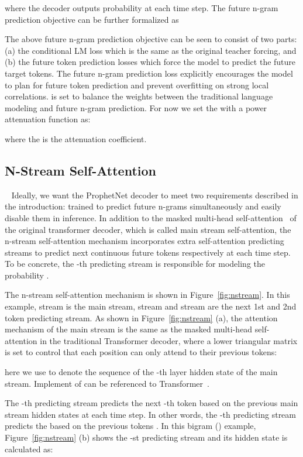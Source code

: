 \documentclass[11pt,a4paper]{article}
\begin{document}
where the decoder outputs  probability at each time step.
The future n-gram prediction objective can be further formalized as 

The above future n-gram prediction objective can be seen to consist of two parts: (a) the conditional LM loss which is the same as the original teacher forcing, and (b) the  future token prediction losses which force the model to predict the future target tokens.
The future n-gram prediction loss explicitly encourages the model to plan for future token prediction and prevent overfitting on strong local correlations. 
 is set to balance the weights between the traditional language modeling and future n-gram prediction. 
For now we set the  with a power attenuation function as:

where the  is the attenuation coefficient. 




\subsection{N-Stream Self-Attention}~\label{sec:m2}
Ideally, we want the ProphetNet decoder to meet two requirements described in the introduction: trained to predict future n-grams simultaneously and easily disable them in inference.
In addition to the masked multi-head self-attention~\cite{vaswani2017attention} of the original transformer decoder, which is called main stream self-attention, the n-stream self-attention mechanism incorporates  extra self-attention predicting streams to predict next  continuous future tokens respectively at each time step.
To be concrete, the -th predicting stream is responsible for modeling the probability .

The n-stream self-attention mechanism is shown in Figure~\ref{fig:nstream}. In this example,  stream is the main stream,  stream and  stream are the next 1st and 2nd token predicting stream. As shown in Figure~\ref{fig:nstream} (a), the attention mechanism of the main stream is the same as the masked multi-head self-attention in the traditional Transformer decoder, where a lower triangular matrix is set to control that each position can only attend to their previous tokens:

here we use  to denote the sequence of the -th layer hidden state of the main stream. Implement of  can be referenced to  Transformer~\cite{vaswani2017attention}.

The -th predicting stream predicts the next -th token based on the previous main stream hidden states at each time step.
In other words, the -th predicting stream predicts the  based on the previous tokens .  
In this  bigram () example, Figure~\ref{fig:nstream} (b) shows the  -st predicting stream and its hidden state is calculated as:
\end{document}
